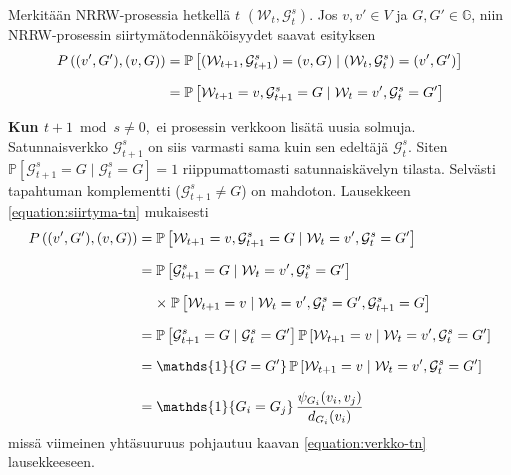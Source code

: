 \documentclass[finnish, 12pt, a4paper, sci, utf8, pdfa]{aaltothesis}
\newcommand{\Grandom}{\mathcal{G}}
\newcommand{\Wrandom}{\mathcal{W}}
\newcommand{\indicator}{\mathopen{\mathds{1}}}
\newcommand*{\prob}{\mathbb{P}}
\begin{document}
Merkitään NRRW-prosessia hetkellä $ t $ $ (\Wrandom_{t}, \Grandom^{s}_{t}) $. Jos $ v, v' \in V $ ja $ G, G' \in \mathbb{G} $, niin NRRW-prosessin siirtymätodennäköisyydet saavat esityksen
\begin{equation}
   \setlength{\jot}{10pt}
   \begin{aligned}
      P\left( (v', G'), (v, G) \right) &= \prob \left[ (\Wrandom_{t+1}, \Grandom^{s}_{t+1}) = (v, G) \mid (\Wrandom_{t}, \Grandom^{s}_{t}) = (v', G') \right] \\
                                       &= \prob \left[ \Wrandom_{t+1} = v, \Grandom^{s}_{t+1} = G \mid \Wrandom_{t} = v', \Grandom^{s}_{t} = G' \right]
      \label{equation:siirtyma-tn}
   \end{aligned}
\end{equation}
{\parindent0pt
\textbf{Kun $ t + 1 \bmod s \neq 0, $} ei prosessin verkkoon lisätä uusia solmuja. Satunnaisverkko $ \Grandom^{s}_{t+1} $ on siis varmasti sama kuin sen edeltäjä $ \Grandom^{s}_{t} $. Siten
$ \prob \left[ \Grandom^{s}_{t+1} = G \mid \Grandom^{s}_{t} = G \right] = 1 $
riippumattomasti satunnaiskävelyn tilasta. Selvästi tapahtuman komplementti ($ \Grandom^{s}_{t+1} \neq G $) on mahdoton. Lausekkeen \ref{equation:siirtyma-tn} mukaisesti
\begin{equation*}
   \setlength{\jot}{10pt}
   \begin{aligned}
   P\left( (v', G'), (v, G) \right) &= \prob \left[ \Wrandom_{t+1} = v, \Grandom^{s}_{t+1} = G \mid \Wrandom_{t} = v', \Grandom^{s}_{t} = G' \right] \\
   &= \prob \left[ \Grandom^{s}_{t+1} = G \mid \Wrandom_{t} = v', \Grandom^{s}_{t} = G' \right] \\
   &\mathrel{\phantom{=}} \times \; \prob \left[ \Wrandom_{t+1} = v \mid \Wrandom_{t} = v', \Grandom^{s}_{t} = G', \Grandom^{s}_{t+1} = G \right] \\
   &= \prob \left[ \Grandom^{s}_{t+1} = G \mid \Grandom^{s}_{t} = G' \right] \prob \left[ \Wrandom_{t+1} = v \mid \Wrandom_{t} = v', \Grandom^{s}_{t} = G' \right] \\
   &= \indicator \left\{ G = G' \right\} \prob \left[ \Wrandom_{t+1} = v \mid \Wrandom_{t} = v', \Grandom^{s}_{t} = G' \right] \\
   &= \indicator \left\{ G_{i} = G_{j} \right\} \frac{\psi_{G_{i}}(v_{i}, v_{j})}{d_{G_{i}}(v_{i})}
   \end{aligned}
\end{equation*}
missä viimeinen yhtäsuuruus pohjautuu kaavan \ref{equation:verkko-tn} lausekkeeseen.

}
\end{document}
